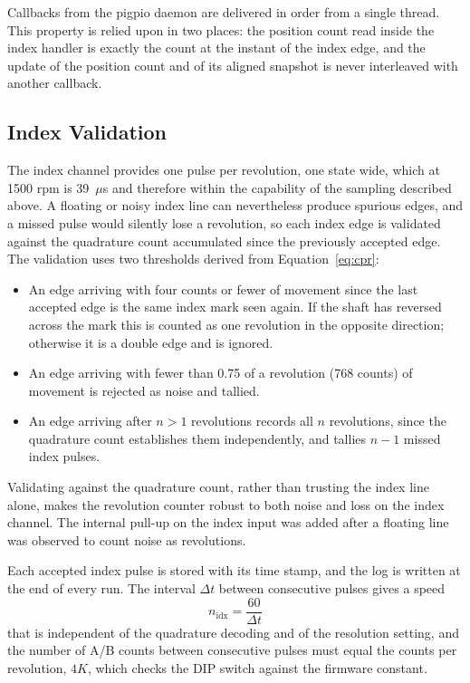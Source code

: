 Callbacks from the pigpio daemon are delivered in order from a single thread. This property is relied upon in two places: the position count read inside the index handler is exactly the count at the instant of the index edge, and the update of the position count and of its aligned snapshot is never interleaved with another callback.

\subsection{Index Validation}
\label{subsec:agit-index}

The index channel provides one pulse per revolution, one state wide, which at 1500 rpm is 39~$\mu$s and therefore within the capability of the sampling described above. A floating or noisy index line can nevertheless produce spurious edges, and a missed pulse would silently lose a revolution, so each index edge is validated against the quadrature count accumulated since the previously accepted edge. The validation uses two thresholds derived from Equation~\ref{eq:cpr}:
\begin{itemize}
    \item An edge arriving with four counts or fewer of movement since the last accepted edge is the same index mark seen again. If the shaft has reversed across the mark this is counted as one revolution in the opposite direction; otherwise it is a double edge and is ignored.
    \item An edge arriving with fewer than 0.75 of a revolution (768 counts) of movement is rejected as noise and tallied.
    \item An edge arriving after $n > 1$ revolutions records all $n$ revolutions, since the quadrature count establishes them independently, and tallies $n - 1$ missed index pulses.
\end{itemize}
Validating against the quadrature count, rather than trusting the index line alone, makes the revolution counter robust to both noise and loss on the index channel. The internal pull-up on the index input was added after a floating line was observed to count noise as revolutions.

Each accepted index pulse is stored with its time stamp, and the log is written at the end of every run. The interval $\Delta t$ between consecutive pulses gives a speed
\begin{equation}
    n_{\mathrm{idx}} = \frac{60}{\Delta t}
    \label{eq:idx-speed}
\end{equation}
that is independent of the quadrature decoding and of the resolution setting, and the number of A/B counts between consecutive pulses must equal the counts per revolution, $4K$, which checks the DIP switch against the firmware constant.

